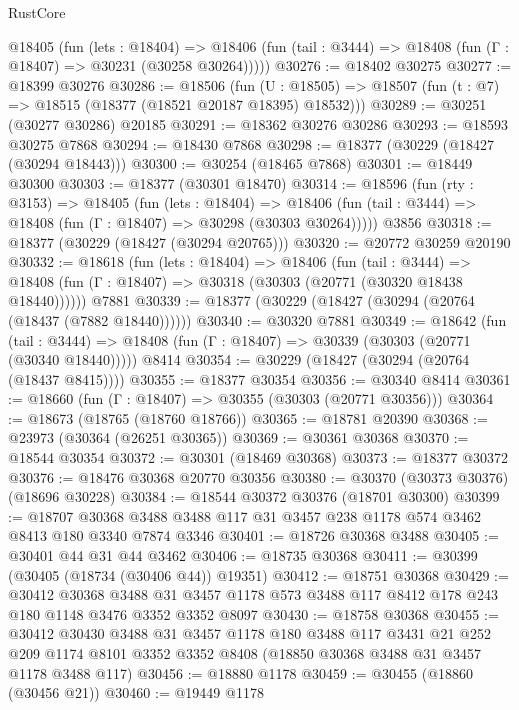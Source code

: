 \begin{lexlean}{RustCore}
\begin{coremodule}
    @18405
      (fun (lets : @18404) =>
      @18406 (fun (tail : @3444) => @18408 (fun (Γ : @18407) => @30231 (@30258 @30264)))))
@30276 := @18402 @30275
@30277 := @18399 @30276
@30286 := @18506
    (fun (U : @18505) => @18507 (fun (t : @7) => @18515 (@18377 (@18521 @20187 @18395) @18532)))
@30289 := @30251 (@30277 @30286) @20185
@30291 := @18362 @30276 @30286
@30293 := @18593 @30275 @7868
@30294 := @18430 @7868
@30298 := @18377 (@30229 (@18427 (@30294 @18443)))
@30300 := @30254 (@18465 @7868)
@30301 := @18449 @30300
@30303 := @18377 (@30301 @18470)
@30314 := @18596
    (fun (rty : @3153) =>
    @18405
      (fun (lets : @18404) =>
      @18406 (fun (tail : @3444) => @18408 (fun (Γ : @18407) => @30298 (@30303 @30264)))))
    @3856
@30318 := @18377 (@30229 (@18427 (@30294 @20765)))
@30320 := @20772 @30259 @20190
@30332 := @18618
    (fun (lets : @18404) =>
    @18406
      (fun (tail : @3444) =>
      @18408 (fun (Γ : @18407) => @30318 (@30303 (@20771 (@30320 @18438 @18440))))))
    @7881
@30339 := @18377 (@30229 (@18427 (@30294 (@20764 (@18437 (@7882 @18440))))))
@30340 := @30320 @7881
@30349 := @18642
    (fun (tail : @3444) => @18408 (fun (Γ : @18407) => @30339 (@30303 (@20771 (@30340 @18440)))))
    @8414
@30354 := @30229 (@18427 (@30294 (@20764 (@18437 @8415))))
@30355 := @18377 @30354
@30356 := @30340 @8414
@30361 := @18660 (fun (Γ : @18407) => @30355 (@30303 (@20771 @30356)))
@30364 := @18673 (@18765 (@18760 @18766))
@30365 := @18781 @20390
@30368 := @23973 (@30364 (@26251 @30365))
@30369 := @30361 @30368
@30370 := @18544 @30354
@30372 := @30301 (@18469 @30368)
@30373 := @18377 @30372
@30376 := @18476 @30368 @20770 @30356
@30380 := @30370 (@30373 @30376) (@18696 @30228)
@30384 := @18544 @30372 @30376 (@18701 @30300)
@30399 := @18707
    @30368
    @3488
    @3488
    @117
    @31
    @3457
    @238
    @1178
    @574
    @3462
    @8413
    @180
    @3340
    @7874
    @3346
@30401 := @18726 @30368 @3488
@30405 := @30401 @44 @31 @44 @3462
@30406 := @18735 @30368
@30411 := @30399 (@30405 (@18734 (@30406 @44)) @19351)
@30412 := @18751 @30368
@30429 := @30412
    @30368
    @3488
    @31
    @3457
    @1178
    @573
    @3488
    @117
    @8412
    @178
    @243
    @180
    @1148
    @3476
    @3352
    @3352
    @8097
@30430 := @18758 @30368
@30455 := @30412
    @30430
    @3488
    @31
    @3457
    @1178
    @180
    @3488
    @117
    @3431
    @21
    @252
    @209
    @1174
    @8101
    @3352
    @3352
    @8408
    (@18850 @30368 @3488 @31 @3457 @1178 @3488 @117)
@30456 := @18880 @1178
@30459 := @30455 (@18860 (@30456 @21))
@30460 := @19449 @1178

\end{coremodule}
\end{lexlean}
